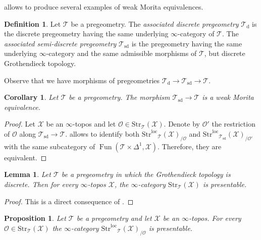 \documentclass[12pt,a4paper,reqno]{amsart}
\theoremstyle{plain}
\newtheorem{lem}[thm]{Lemma}
\newtheorem{prop}[thm]{Proposition}
\newtheorem{cor}[thm]{Corollary}
\theoremstyle{definition}
\newtheorem{defin}[thm]{Definition}
\theoremstyle{remark}
\numberwithin{equation}{section}
\begin{document}
 allows to produce several examples of weak Morita equivalences.

\begin{defin}
	Let ${\mathcal T}$ be a pregeometry. The \emph{associated discrete pregeometry} ${\mathcal T}_{\mathrm{d}}$ is the discrete pregeometry having the same underlying $\infty$-category of ${\mathcal T}$.
	The \emph{associated semi-discrete pregeometry} ${\mathcal T}_{\mathrm{sd}}$ is the pregeometry having the same underlying $\infty$-category and the same admissible morphisms of ${\mathcal T}$, but discrete Grothendieck topology.
\end{defin}

Observe that we have morphisms of pregeometries ${\mathcal T}_{\mathrm{d}} \to {\mathcal T}_{\mathrm{sd}} \to {\mathcal T}$.

\begin{cor} \label{cor:semi_discrete_weak_Morita}
	Let ${\mathcal T}$ be a pregeometry. The morphism ${\mathcal T}_{\mathrm{sd}} \to {\mathcal T}$ is a weak Morita equivalence.
\end{cor}

\begin{proof}
	Let ${\mathcal X}$ be an $\infty$-topos and let ${\mathcal O} \in {\mathrm{Str}}_{\mathcal T}({\mathcal X})$. Denote by ${\mathcal O}'$ the restriction of ${\mathcal O}$ along ${\mathcal T}_{\mathrm{sd}} \to {\mathcal T}$.
	 allows to identify both ${\mathrm{Str}^\mathrm{loc}}_{\mathcal T}({\mathcal X})_{/{\mathcal O}}$ and ${\mathrm{Str}^\mathrm{loc}}_{{\mathcal T}_{\mathrm{sd}}}({\mathcal X})_{/{\mathcal O}'}$ with the same subcategory of $\operatorname{Fun}({\mathcal T} \times \Delta^1, {\mathcal X})$. Therefore, they are equivalent.
\end{proof}

\begin{lem} \label{lem:Str_presentable}
	Let ${\mathcal T}$ be a pregeometry in which the Grothendieck topology is discrete. Then for every $\infty$-topos ${\mathcal X}$, the $\infty$-category ${\mathrm{Str}}_{\mathcal T}({\mathcal X})$ is presentable.
\end{lem}

\begin{proof}
	This is a direct consequence of \cite[Lemmas 5.5.4.18, 5.5.4.19]{HTT}.
\end{proof}

\begin{prop} \label{prop:O_premodules_presentable}
	Let ${\mathcal T}$ be a pregeometry and let ${\mathcal X}$ be an $\infty$-topos.
	For every ${\mathcal O} \in {\mathrm{Str}}_{\mathcal T}({\mathcal X})$ the $\infty$-category ${\mathrm{Str}^\mathrm{loc}}_{\mathcal T}({\mathcal X})_{/ {\mathcal O}}$ is presentable.
\end{prop}
\end{document}
